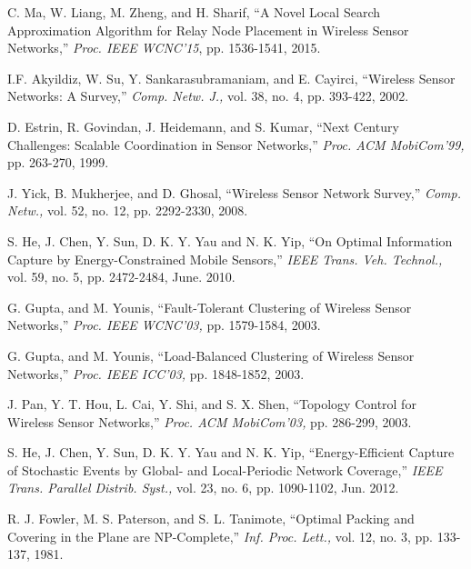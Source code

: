 \documentclass[journal]{IEEEtran}
\begin{document}
\appendices





\ifCLASSOPTIONcaptionsoff
  \newpage
\fi





\begin{thebibliography}{1}
C. Ma, W. Liang, M. Zheng, and H. Sharif, ``A Novel Local Search Approximation Algorithm for
Relay Node Placement in Wireless Sensor Networks,'' \emph{Proc. IEEE WCNC'15}, pp. 1536-1541, 2015.

I.F. Akyildiz, W. Su, Y. Sankarasubramaniam, and E. Cayirci, ``Wireless Sensor Networks:
A Survey,'' {\it Comp. Netw. J.,} vol. 38, no. 4, pp. 393-422, 2002.

D. Estrin, R. Govindan, J. Heidemann, and S. Kumar, ``Next Century Challenges: Scalable Coordination
in Sensor Networks,'' {\it Proc. ACM MobiCom'99,} pp. 263-270, 1999.

J. Yick, B. Mukherjee, and D. Ghosal, ``Wireless Sensor Network Survey,'' {\it Comp. Netw.,}
vol. 52, no. 12, pp. 2292-2330, 2008.


 S. He, J. Chen, Y. Sun, D. K. Y. Yau and N. K. Yip, ``On Optimal Information Capture by Energy-Constrained Mobile Sensors,'' {\it IEEE Trans. Veh. Technol.,} vol. 59, no. 5, pp. 2472-2484, June. 2010.





G. Gupta, and M. Younis, ``Fault-Tolerant Clustering of Wireless Sensor Networks,'' {\it Proc. IEEE
WCNC'03,} pp. 1579-1584, 2003.

G. Gupta, and M. Younis, ``Load-Balanced Clustering of Wireless Sensor Networks,'' {\it Proc. IEEE
ICC'03,} pp. 1848-1852, 2003.

J. Pan, Y. T. Hou, L. Cai, Y. Shi, and S. X. Shen, ``Topology Control for Wireless Sensor Networks,''
{\it Proc. ACM MobiCom'03,} pp. 286-299, 2003.

 S. He, J. Chen, Y. Sun, D. K. Y. Yau and N. K. Yip, ``Energy-Efficient Capture of Stochastic Events by Global- and Local-Periodic Network Coverage,'' {\it IEEE Trans. Parallel Distrib. Syst.,} vol. 23, no. 6, pp. 1090-1102, Jun. 2012.

R. J. Fowler, M. S. Paterson, and S. L. Tanimote, ``Optimal Packing and Covering in the Plane are NP-Complete,''
{\it Inf. Proc. Lett.,} vol. 12, no. 3, pp. 133-137, 1981.


\end{thebibliography}
\end{document}
